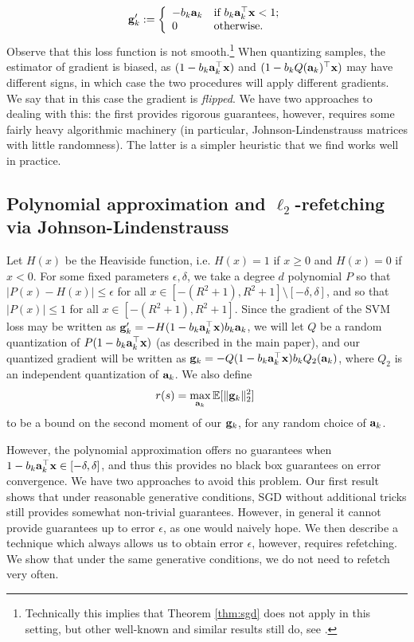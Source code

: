 \documentclass{article}
\def\a{{\bf a}}
\def\g{{\bf g}}
\def\x{{\bf x}}
\def\E{\mathbb{E}}
\begin{document}
\[
\g'_k := \left\{ \begin{array}{ll}
         -b_k \a_k & \mbox{if $b_k \a_k^\top \x < 1$};\\
         0 & \mbox{otherwise}. \end{array} \right.
\]
Observe that this loss function is not smooth.\footnote{Technically this implies that Theorem \ref{thm:sgd} does not apply in this setting, but other well-known and similar results still do, see \cite{2014arXiv1405.4980B}.}
When quantizing samples, the estimator of gradient is biased, as $(1 - b_k \a_k^\top \x)$ and $(1 - b_k Q(\a_k)^\top \x)$ may have different signs, in which case the two procedures will apply different gradients. We say that in this case the gradient is \emph{flipped}. 
We have two approaches to dealing with this: the first provides rigorous guarantees, however, requires some fairly heavy algorithmic machinery (in particular, Johnson-Lindenstrauss matrices with little randomness).
The latter is a simpler heuristic that we find works well in practice.


\subsection{Polynomial approximation and $\ell_2$-refetching via Johnson-Lindenstrauss}
Let $H(x)$ be the Heaviside function, i.e. $H(x) = 1$ if $x \geq 0$ and $H(x) = 0$ if $x < 0$. 
For some fixed parameters $\epsilon, \delta$, we take a degree $d$ polynomial $P$ so that $| P(x) - H(x) | \leq \epsilon$ for all $x \in [-(R^2 + 1), R^2 + 1] \setminus [-\delta, \delta]$, and so that $|P(x)| \leq 1$ for all $x \in  [-(R^2 + 1), R^2 + 1]$.
Since the gradient of the SVM loss may be written as $\g'_k = -H(1 - b_k \a_k^\top \x) b_k \a_k$, we will let $Q$ be a random quantization of $P(1 - b_k \a_k^\top \x)$ (as described in the main paper), and our quantized gradient will be written as $\g_k = -Q(1 - b_k \a_k^\top \x) b_k Q_2 (\a_k)$, where $Q_2$ is an independent quantization of $\a_k$.
We also define
\[
r(s) = \max_{\a_k} \E [\| \g_k \|_2^2] \; 
\]
to be a bound on the second moment of our $\g_k$, for any random choice of $\a_k$.

However, the polynomial approximation offers no guarantees when $1 - b_k \a_k^\top \x \in [-\delta, \delta]$, and thus this provides no black box guarantees on error convergence.
We have two approaches to avoid this problem.
Our first result shows that under reasonable generative conditions, SGD without additional tricks still provides somewhat non-trivial guarantees. However, in general it cannot provide guarantees up to error $\epsilon$, as one would naively hope.
We then describe a technique which always allows us to obtain error $\epsilon$, however, requires refetching.
We show that under the same generative conditions, we do not need to refetch very often.
\end{document}
